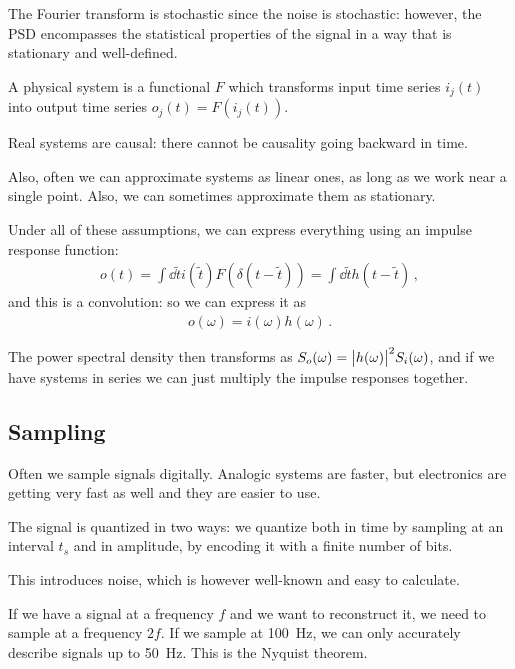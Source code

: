 \documentclass[main.tex]{subfiles}
\begin{document}

The Fourier transform is stochastic since the noise is stochastic: however, the PSD encompasses the statistical properties of the signal in a way that is stationary and well-defined. 

A physical system is a functional \(F\) which transforms input time series \(i_j (t)\) into output time series \(o_j (t) = F(i_j(t))\). 

Real systems are causal: there cannot be causality going backward in time. 

Also, often we can approximate systems as linear ones, as long as we work near a single point. 
Also, we can sometimes approximate them as stationary. 

Under all of these assumptions, we can express everything using an impulse response function: 
%
\begin{align}
o(t) = \int \dd{\widetilde{t}} i(\widetilde{t}) F( \delta (t - \widetilde{t})) 
= \int \dd{\widetilde{t}} h(t - \widetilde{t})
\,,
\end{align}
%
and this is a convolution: so we can express it as 
%
\begin{align}
o(\omega ) = i(\omega ) h(\omega )
\,.
\end{align}

The power spectral density then transforms as \(S_o (\omega ) = \abs{h(\omega )}^2 S_i (\omega )\), and if we have systems in series we can just multiply the impulse responses together. 

\subsection{Sampling}

Often we sample signals digitally.
Analogic systems are faster, but electronics are getting very fast as well and they are easier to use.

The signal is quantized in two ways: we quantize both in time by sampling at an interval \(t_s\) and in amplitude, by encoding it with a finite number of bits.

This introduces noise, which is however well-known and easy to calculate.

If we have a signal at a frequency \(f\) and we want to reconstruct it, we need to sample at a frequency \(2f\). 
If we sample at \SI{100}{Hz}, we can only accurately describe signals up to \SI{50}{Hz}. 
This is the Nyquist theorem.
\end{document}
